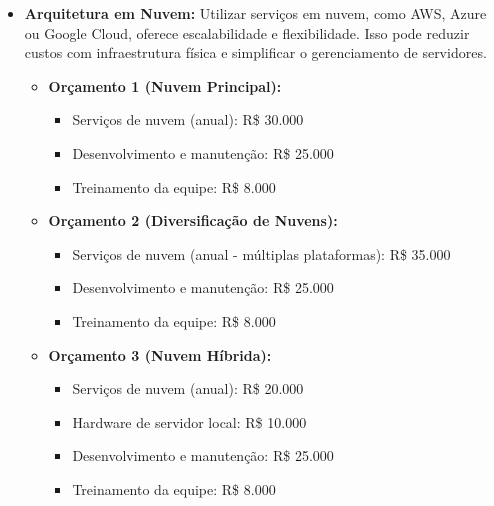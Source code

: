 \begin{itemize}
		\item \textbf{Arquitetura em Nuvem:} Utilizar serviços em nuvem, como AWS, Azure ou Google Cloud, oferece escalabilidade e flexibilidade. Isso pode reduzir custos com infraestrutura física e simplificar o gerenciamento de servidores.
		
		\begin{itemize}
			\item \textbf{Orçamento 1 (Nuvem Principal):}
			\begin{itemize}
				\item Serviços de nuvem (anual): R\$ 30.000
				\item Desenvolvimento e manutenção: R\$ 25.000
				\item Treinamento da equipe: R\$ 8.000
			\end{itemize}
			\item \textbf{Orçamento 2 (Diversificação de Nuvens):}
			\begin{itemize}
				\item Serviços de nuvem (anual - múltiplas plataformas): R\$ 35.000
				\item Desenvolvimento e manutenção: R\$ 25.000
				\item Treinamento da equipe: R\$ 8.000
			\end{itemize}
			\item \textbf{Orçamento 3 (Nuvem Híbrida):}
			\begin{itemize}
				\item Serviços de nuvem (anual): R\$ 20.000
				\item Hardware de servidor local: R\$ 10.000
				\item Desenvolvimento e manutenção: R\$ 25.000
				\item Treinamento da equipe: R\$ 8.000
			\end{itemize}
		\end{itemize}
	\end{itemize}
	
